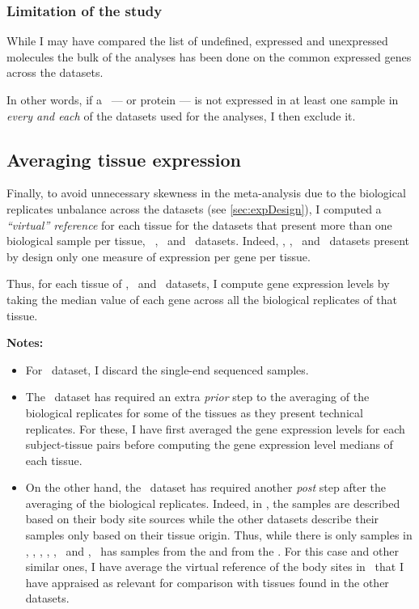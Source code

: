 \subsubsection{Limitation of the study}
While I may have compared the list of
undefined, expressed and unexpressed molecules
the bulk of the analyses has been done on the common expressed genes across
the datasets.

In other words, if a \mRNA\ --- or protein --- is not expressed in at least
one sample in \emph{every and each} of the datasets used for the analyses,
I then exclude it.

\subsection{Averaging tissue expression}

Finally, to avoid unnecessary skewness in the meta-analysis due to
the biological replicates unbalance across the datasets (see \cref{sec:expDesign}),
I computed a \emph{\enquote{virtual} reference} for each tissue
for the datasets that present more than one biological sample per tissue,
\ie\ \vt, \uhlen\ and \gtex\ datasets.
Indeed, \castle, \cutler, \kuster\ and \pandey\ datasets present by design only
one measure of expression per gene per tissue.

Thus, for each tissue of \vt, \uhlen\ and \gtex\ datasets, I compute gene
expression levels by taking the median value of each gene across all the
biological replicates of that tissue.

\textbf{Notes:}
\begin{itemize}[topsep=0pt,nosep]
        \item For \ibm\ dataset, I discard the single-end sequenced samples.
        \item The \uhlen\ dataset has required an extra \emph{prior} step to
            the averaging of the biological replicates
            for some of the tissues as they present technical replicates.
            For these, I have first averaged the gene expression levels
            for each subject-tissue pairs before computing
            the gene expression level medians of each tissue.
        \item On the other hand, the \gtex\ dataset has required another
            \emph{post} step after the averaging of the biological replicates.
            Indeed, in \gtex, the samples are described based on their
            body site sources while the other datasets describe their samples
            only based on their tissue origin.
            Thus, while there is only  samples in \castle, \vt,
            \ibm, \uhlen, \cutler, \kuster\ and \pandey,
            \gtex\ has samples from the 
            and from the .
            For this case and other similar ones,
            I have average the virtual reference of the body sites in \gtex\
            that I have appraised as relevant for comparison with tissues found
            in the other datasets.
\end{itemize}

